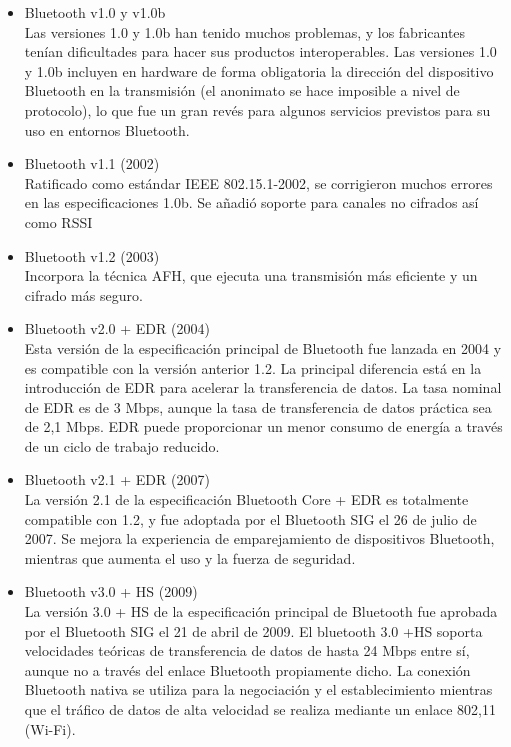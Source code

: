 \begin{itemize}

\item Bluetooth v1.0 y v1.0b\\
Las versiones 1.0 y 1.0b han tenido muchos problemas, y los fabricantes tenían dificultades para hacer sus productos interoperables. Las versiones 1.0 y 1.0b incluyen en hardware de forma obligatoria la dirección del dispositivo Bluetooth en la transmisión (el anonimato se hace imposible a nivel de protocolo), lo que fue un gran revés para algunos servicios previstos para su uso en entornos Bluetooth.
\item Bluetooth v1.1 (2002)\\
Ratificado como estándar IEEE 802.15.1-2002, se corrigieron muchos errores en las especificaciones 1.0b. Se añadió soporte para canales no cifrados así como \ac{RSSI}
\item Bluetooth v1.2 (2003)\\
Incorpora la técnica \ac{AFH}, que ejecuta una transmisión más eficiente y un cifrado más seguro.
\item Bluetooth v2.0 + EDR (2004)\\
Esta versión de la especificación principal de Bluetooth fue lanzada en 2004 y es compatible con la versión anterior 1.2. La principal diferencia está en la introducción de \ac{EDR}  para acelerar la transferencia de datos. La tasa nominal de \ac{EDR} es de 3 Mbps, aunque la tasa de transferencia de datos práctica sea de 2,1 Mbps. \ac{EDR} puede proporcionar un menor consumo de energía a través de un ciclo de trabajo reducido.
\item Bluetooth v2.1 + EDR (2007)\\
La versión 2.1 de la especificación Bluetooth Core + \ac{EDR} es totalmente compatible con 1.2, y fue adoptada por el Bluetooth \ac{SIG} el 26 de julio de 2007. Se mejora la experiencia de emparejamiento de dispositivos Bluetooth, mientras que aumenta el uso y la fuerza de seguridad. 
\item Bluetooth v3.0 + HS (2009)\\
La versión 3.0 + HS de la especificación principal de Bluetooth fue aprobada por el Bluetooth \ac{SIG} el 21 de abril de 2009. El bluetooth 3.0 +HS soporta velocidades teóricas de transferencia de datos de hasta 24 Mbps entre sí, aunque no a través del enlace Bluetooth propiamente dicho. La conexión Bluetooth nativa se utiliza para la negociación y el establecimiento mientras que el tráfico de datos de alta velocidad se realiza mediante un enlace 802,11 (Wi-Fi).

\end{itemize}

